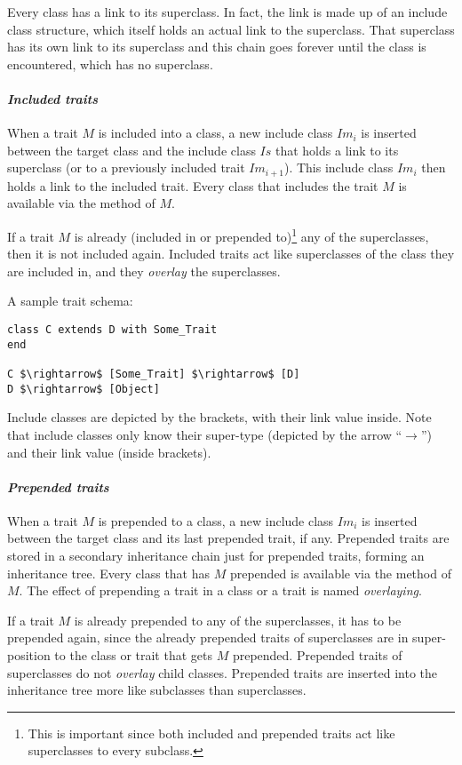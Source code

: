 Every class has a link to its superclass. In fact, the link is made up of an include class structure, which itself holds an actual link to the superclass. That superclass has its own link to its superclass and this chain goes forever until the  class is encountered, which has no superclass. 

\paragraph{\em Included traits}
When a trait $M$ is included into a class, a new include class $Im_i$ is inserted between the target class and the include class $Is$ that holds a link to its superclass (or to a previously included trait $Im_{i+1}$). This include class $Im_i$ then holds a link to the included trait. Every class that includes the trait $M$ is available via the  method of $M$. 

If a trait $M$ is already (included in or prepended to)\footnote{This is important since both included and prepended traits act like superclasses to every subclass.} any of the superclasses, then it is not included again. Included traits act like superclasses of the class they are included in, and they {\em overlay} the superclasses. 

\example A sample trait schema:
\begin{lstlisting}
class C extends D with Some_Trait
end

C $\rightarrow$ [Some_Trait] $\rightarrow$ [D]
D $\rightarrow$ [Object]
\end{lstlisting}
Include classes are depicted by the brackets, with their link value inside. Note that include classes only know their super-type (depicted by the arrow ``$\rightarrow$'') and their link value (inside brackets). 

\paragraph{\em Prepended traits}
When a trait $M$ is prepended to a class, a new include class $Im_i$ is inserted between the target class and its last prepended trait, if any. Prepended traits are stored in a secondary inheritance chain just for prepended traits, forming an inheritance tree. Every class that has $M$ prepended is available via the  method of $M$. The effect of prepending a trait in a class or a trait is named {\em overlaying}. 

If a trait $M$ is already prepended to any of the superclasses, it has to be prepended again, since the already prepended traits of superclasses are in super-position to the class or trait that gets $M$ prepended. Prepended traits of superclasses do not {\em overlay} child classes. Prepended traits are inserted into the inheritance tree more like subclasses than superclasses. 

